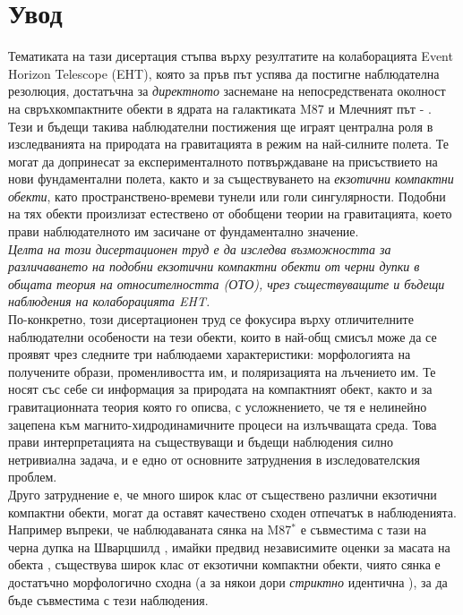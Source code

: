 \section{Увод}

Тематиката на тази дисертация стъпва върху резултатите на колаборацията Event Horizon Telescope (EHT), която за пръв път успява да постигне наблюдателна резолюция, достатъчна за \emph{директното} заснемане на непосредствената околност на свръхкомпактните обекти в ядрата на галактиката M87 и Млечният път \cite{EHT_M87_I} - \cite{EHT_SGR_VIII}. Тези и бъдещи такива наблюдателни постижения ще играят централна роля в изследванията на природата на гравитацията в режим на най-силните полета. Те могат да допринесат за експерименталното потвърждаване на присъствието на нови фундаментални полета, както и за съществуването на \emph{екзотични компактни обекти}, като пространствено-времеви тунели или голи сингулярности. Подобни на тях обекти произлизат естествено от обобщени теории на гравитацията, което прави наблюдателното им засичане от фундаментално значение.\\

\emph{Целта на този дисертационен труд е да изследва възможността за различаването на подобни екзотични компактни обекти от черни дупки в общата теория на относителността (ОТО), чрез съществуващите и бъдещи наблюдения на колаборацията EHT.}\\

\noindent По-конкретно, този дисертационен труд се фокусира върху отличителните наблюдателни особености на тези обекти, които в най-общ смисъл може да се проявят чрез следните три наблюдаеми характеристики: морфологията на получените образи, променливостта им, и поляризацията на лъчението им. Те носят със себе си информация за природата на компактният обект, както и за гравитационната теория която го описва, с усложнението, че тя е нелинейно зацепена към магнито-хидродинамичните процеси на излъчващата среда. Това прави интерпретацията на съществуващи и бъдещи наблюдения силно нетривиална задача, и е едно от основните затруднения в изследователския проблем.\\

\noindent Друго затруднение е, че много широк клас от съществено различни екзотични компактни обекти, могат да оставят качествено сходен отпечатък в наблюденията. Например въпреки, че наблюдаваната сянка на M87$^*$ е съвместима с тази на черна дупка на Шварцшилд \cite{EHT_M87_I}, имайки предвид независимите оценки за масата на обекта \cite{Gebhardt_2011}, съществува широк клас от екзотични компактни обекти, чиято сянка е достатъчно морфологично сходна (а за някои дори \emph{стриктно} идентична \cite{PhysRevD.103.084040}), за да бъде съвместима с тези наблюдения.\\

